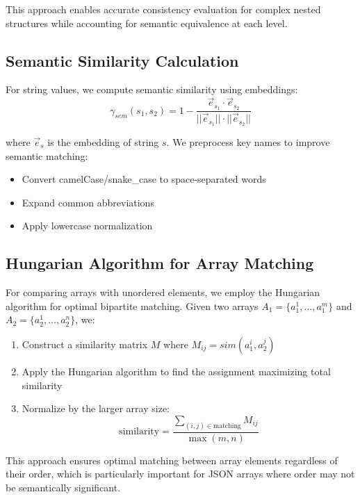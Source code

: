 \documentclass[letterpaper]{article} %
\begin{document}
This approach enables accurate consistency evaluation for complex nested structures while accounting for semantic equivalence at each level.

\subsection{Semantic Similarity Calculation}

For string values, we compute semantic similarity using embeddings:
\begin{equation}
\gamma_{sem}(s_1, s_2) = 1 - \frac{\vec{e}_{s_1} \cdot \vec{e}_{s_2}}{||\vec{e}_{s_1}|| \cdot ||\vec{e}_{s_2}||}
\end{equation}

where $\vec{e}_s$ is the embedding of string $s$. We preprocess key names to improve semantic matching:

\begin{itemize}
\item Convert camelCase/snake\_case to space-separated words
\item Expand common abbreviations
\item Apply lowercase normalization
\end{itemize}

\subsection{Hungarian Algorithm for Array Matching}

For comparing arrays with unordered elements, we employ the Hungarian algorithm for optimal bipartite matching. Given two arrays $A_1 = \{a_1^1, ..., a_1^m\}$ and $A_2 = \{a_2^1, ..., a_2^n\}$, we:

\begin{enumerate}
\item Construct a similarity matrix $M$ where $M_{ij} = sim(a_1^i, a_2^j)$
\item Apply the Hungarian algorithm to find the assignment maximizing total similarity
\item Normalize by the larger array size: 
\begin{equation}
\text{similarity} = \frac{\sum_{(i,j) \in \text{matching}} M_{ij}}{\max(m, n)}
\end{equation}
\end{enumerate}

This approach ensures optimal matching between array elements regardless of their order, which is particularly important for JSON arrays where order may not be semantically significant.
\end{document}
